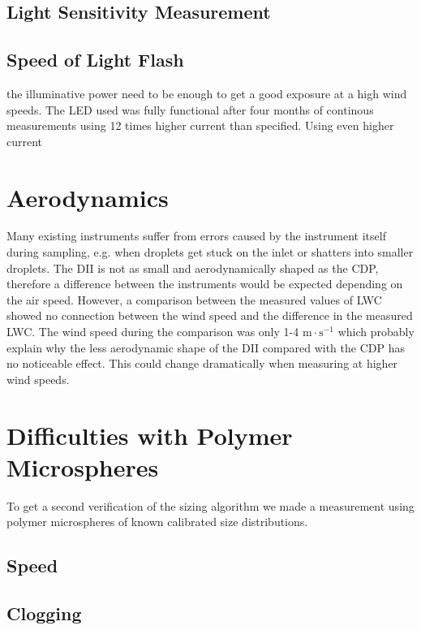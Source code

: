 \subsection{Light Sensitivity Measurement}

\subsection{Speed of Light Flash}

the illuminative power need to be enough to get a good exposure at a high wind speeds.
The LED used was fully functional after four months of continous measurements using 12 times higher current than specified. Using even higher current 

\section{Aerodynamics}

Many existing instruments suffer from errors caused by the instrument itself during sampling, e.g. when droplets get stuck on the inlet or shatters into smaller droplets. The DII is not as small and aerodynamically shaped as the CDP, therefore a difference between the instruments would be expected depending on the air speed. However, a comparison between the measured values of LWC showed no connection between the wind speed and the difference in the measured LWC. The wind speed during the comparison was only 1-4 $\mathrm{m \cdot s^{-1}}$ which probably explain why the less aerodynamic shape of the DII compared with the CDP has no noticeable effect. This could change dramatically when measuring at higher wind speeds.

\section{Difficulties with Polymer Microspheres}

To get a second verification of the sizing algorithm we made a measurement using polymer microspheres of known calibrated size distributions.

\subsection{Speed}

\subsection{Clogging}

